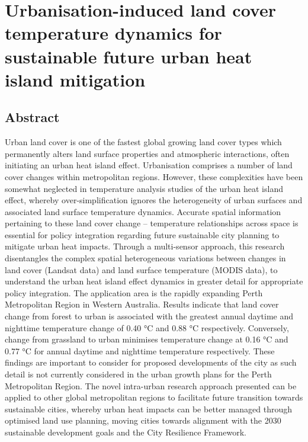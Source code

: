 \documentclass[]{book}
\begin{document}
\chapter{Urbanisation-induced land cover temperature dynamics for
sustainable future urban heat island
mitigation}\label{urbanisation-induced-land-cover-temperature-dynamics-for-sustainable-future-urban-heat-island-mitigation}

\section{Abstract}\label{abstract-3}

Urban land cover is one of the fastest global growing land cover types
which permanently alters land surface properties and atmospheric
interactions, often initiating an urban heat island effect. Urbanisation
comprises a number of land cover changes within metropolitan regions.
However, these complexities have been somewhat neglected in temperature
analysis studies of the urban heat island effect, whereby
over-simplification ignores the heterogeneity of urban surfaces and
associated land surface temperature dynamics. Accurate spatial
information pertaining to these land cover change -- temperature
relationships across space is essential for policy integration regarding
future sustainable city planning to mitigate urban heat impacts. Through
a multi-sensor approach, this research disentangles the complex spatial
heterogeneous variations between changes in land cover (Landsat data)
and land surface temperature (MODIS data), to understand the urban heat
island effect dynamics in greater detail for appropriate policy
integration. The application area is the rapidly expanding Perth
Metropolitan Region in Western Australia. Results indicate that land
cover change from forest to urban is associated with the greatest annual
daytime and nighttime temperature change of 0.40 °C and 0.88 °C
respectively. Conversely, change from grassland to urban minimises
temperature change at 0.16 °C and 0.77 °C for annual daytime and
nighttime temperature respectively. These findings are important to
consider for proposed developments of the city as such detail is not
currently considered in the urban growth plans for the Perth
Metropolitan Region. The novel intra-urban research approach presented
can be applied to other global metropolitan regions to facilitate future
transition towards sustainable cities, whereby urban heat impacts can be
better managed through optimised land use planning, moving cities
towards alignment with the 2030 sustainable development goals and the
City Resilience Framework.
\end{document}
